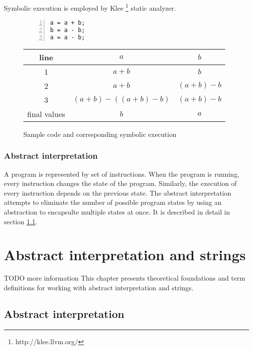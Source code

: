\documentclass[12pt,final,oneside]{fithesis2}
\theoremstyle{definition}
\begin{document}
Symbolic execution is employed by Klee \footnote{http://klee.llvm.org/}
static analyzer.

\begin{figure}[h]
\begin{minipage}{0.3\textwidth}
\begin{lstlisting}[numbers=left]
a = a + b;
b = a - b;
a = a - b;
\end{lstlisting}
\end{minipage}
\begin{minipage}{0.7\textwidth}
\begin{tabular}{c|c|c}
line & $a$                       & $b$ \\
\hline
1    & $a + b$                   & $b$ \\
2    & $a + b$                   & $(a + b) - b$ \\
3    & $(a + b) - ((a + b) - b)$ & $(a + b) - b$ \\
\hline \hline
final values & $b$             & $a$ \\
\end{tabular}
\end{minipage}
\caption{Sample code and corresponding symbolic execution}
\label{fig:se}
\end{figure}

\subsection{Abstract interpretation}

A program is represented by set of instructions. When the program is
running, every instruction changes the state of the program. Similarly,
the execution of every instruction depends on the previous state.
The abstract interpretation attempts to eliminate the number of possible
program states by using an abstraction to encapsulte multiple states at once.
It is described in detail in section \ref{sec:abstractinterpretation}.


\chapter{Abstract interpretation and strings}
\label{chap:preliminaries}

TODO more information
This chapter presents theoretical foundations and term definitions for working with
abstract interpretation and strings.


\section{Abstract interpretation}
\label{sec:abstractinterpretation}
\end{document}
